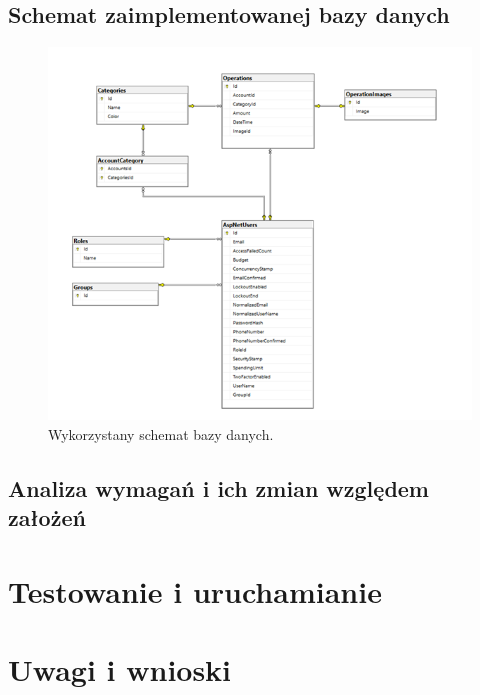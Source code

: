 \documentclass[12pt,a4paper,oneside]{article}
\begin{document}
\subsection{Schemat zaimplementowanej bazy danych}
\begin{figure}[H]
    \centering
    \includegraphics[width=\hsize,keepaspectratio]{images/DB2.png}
    \caption{Wykorzystany schemat bazy danych.}
\end{figure}

\subsection{Analiza wymagań i ich zmian względem założeń}


\section{Testowanie i uruchamianie}

\section{Uwagi i wnioski}
\end{document}
